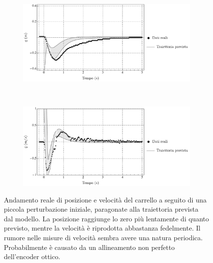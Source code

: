\begin{figure}
    \centering
    \begin{subfigure}[]{\textwidth}
        \centering
        \includegraphics[width=\textwidth]{assets/x-plot}
    \end{subfigure}
    \\[5ex]
    \begin{subfigure}[]{\textwidth}
        \centering
        \includegraphics[width=\textwidth]{assets/v-plot}
    \end{subfigure}

    \caption[Resistenza alle perturbazioni: posizione e velocità]{
        Andamento reale di posizione e velocità del carrello
        a seguito di una piccola perturbazione iniziale,
        paragonate alla traiettoria prevista dal modello.
        La posizione raggiunge lo zero più lentamente di quanto previsto,
        mentre la velocità è riprodotta abbastanza fedelmente.
        Il rumore nelle misure di velocità sembra avere una natura periodica.
        Probabilmente è causato da un allineamento non perfetto dell'encoder
        ottico.
    }
    \label{fig:swag1}
\end{figure}


